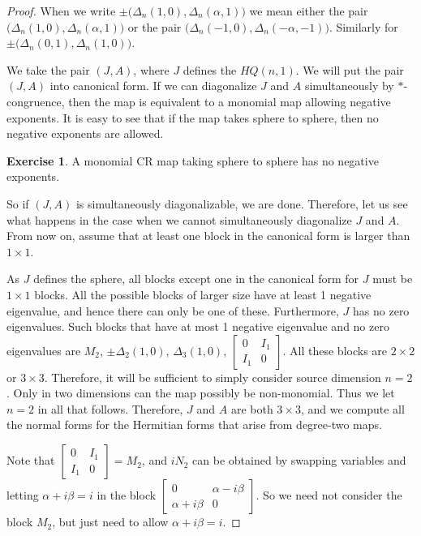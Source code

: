 \documentclass[12pt,openany]{book}
\theoremstyle{plain}
\theoremstyle{remark}
\theoremstyle{definition}
\theoremstyle{exercise}
\newtheorem{exercise}{Exercise}[section]
\theoremstyle{example}
\begin{document}
\begin{proof}
When we write $\pm \bigl( \Delta_n(1,0),\Delta_n(\alpha,1) \bigr)$ we mean
either 
the pair $\bigl( \Delta_n(1,0),\Delta_n(\alpha,1) \bigr)$ or the pair
$\bigl(\Delta_n(-1,0), \Delta_n(-\alpha,-1) \bigr)$.  Similarly for $\pm
\bigl( \Delta_n(0,1),\Delta_n(1,0) \bigr)$.

We take the pair $(J,A)$, where $J$ defines the $HQ(n,1)$.
We will put the pair $(J,A)$ into canonical
form.
If we can diagonalize $J$ and $A$ simultaneously by $*$-congruence, then
the map is equivalent to a monomial map allowing negative exponents.
It is easy to see that if the map takes sphere to sphere, then no negative
exponents are allowed.

\begin{exercise}
A monomial CR map taking sphere to sphere has no negative exponents.
\end{exercise}

So if $(J,A)$ is simultaneously diagonalizable, we are done.
Therefore,
let us see what
happens in the case when we cannot simultaneously diagonalize $J$ and $A$.
From now on, assume that at least
one block in the canonical form is larger than $1 \times 1$.

As $J$ defines the sphere,
all blocks
except one in the canonical form for $J$ must be $1 \times 1$ blocks.
All the possible blocks of larger size have at least 1 negative
eigenvalue, and hence there can only be one of these.  Furthermore, $J$
has no zero eigenvalues.
Such blocks that have at most 1 negative eigenvalue and no zero eigenvalues
are
$M_2$, $\pm \Delta_2(1,0)$, $\Delta_3(1,0)$,
$\left[ \begin{smallmatrix} 0 & I_1 \\ I_1 & 0 \end{smallmatrix} \right]$.
All these blocks are $2 \times 2$ or $3 \times 3$.
Therefore, it will be sufficient to simply consider source dimension $n=2$.
Only in two dimensions can the map possibly be non-monomial.
Thus we let $n=2$ in all that follows.
Therefore,
$J$ and $A$ are both
$3 \times 3$, and we compute all the normal forms for the
Hermitian forms that arise from degree-two maps.

Note that 
$\left[ \begin{smallmatrix} 0 & I_1 \\ I_1 & 0 \end{smallmatrix} \right] =
M_2$, and $iN_2$ can be obtained by swapping variables and letting
$\alpha+i\beta = i$
in
the block 
$\left[ \begin{smallmatrix} 0 & \alpha-i\beta \\ \alpha+i\beta & 0 \end{smallmatrix} \right]$.
So we need not consider the block $M_2$, but just need to allow
$\alpha+i\beta = i$.


\end{proof}
\end{document}
